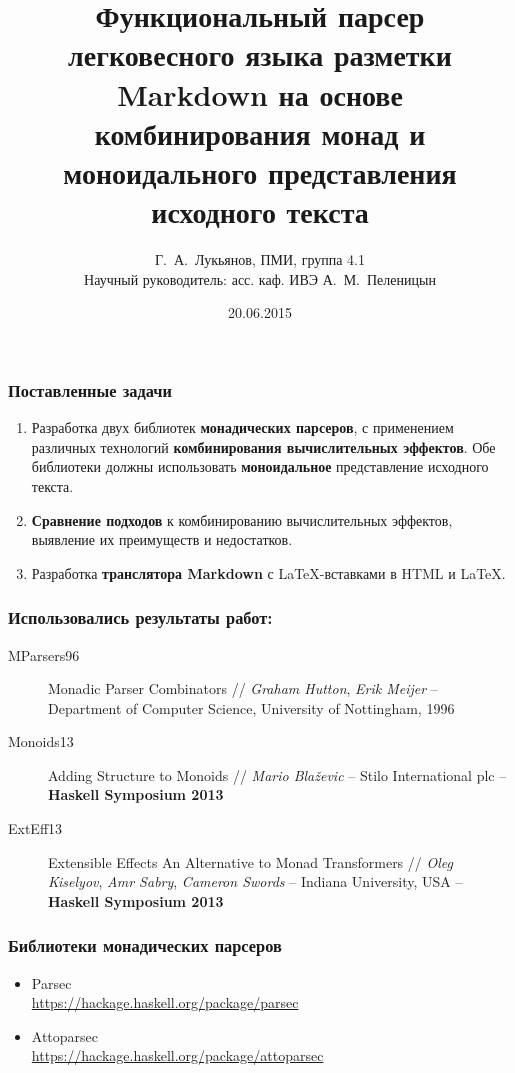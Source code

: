 \documentclass[12pt, compress, t]{beamer}
\title{Функциональный парсер легковесного языка разметки Markdown
на основе комбинирования монад и моноидального представления исходного текста}
\date{20.06.2015}
\author{Г.~А.~Лукьянов, ПМИ, группа 4.1 \\{Научный руководитель: асс. каф. ИВЭ А.~М.~Пеленицын}}
\institute{Институт математики, механики и компьютерных наук ЮФУ}
\begin{document}
\maketitle

\begin{frame}[fragile]
  \frametitle{Поставленные задачи}
  \begin{enumerate}
    \item Разработка двух библиотек \textbf{монадических парсеров}, 
    с применением различных технологий \textbf{комбинирования вычислительных 
    эффектов}. Обе библиотеки должны использовать \textbf{моноидальное}
    представление исходного текста.
    \item \textbf{Сравнение подходов} к комбинированию вычислительных эффектов, выявление их преимуществ и недостатков.
    \item Разработка \textbf{транслятора Markdown} с \LaTeX-вставками в HTML и \LaTeX.
  \end{enumerate}
\end{frame}

\begin{frame}[fragile]
  \frametitle{Использовались результаты работ: }
  \begin{description}
    \item [MParsers96]
    Monadic Parser Combinators // \textit{Graham Hutton}, \textit{Erik Meijer} –
Department of Computer Science, University of Nottingham, 1996
    \item [Monoids13]
    Adding Structure to Monoids // \textit{Mario Blaževic} – Stilo International plc – \\\textbf{Haskell Symposium 2013}
    \item [ExtEff13] 
    Extensible Effects An Alternative to Monad Transformers // \textit{Oleg
Kiselyov}, \textit{Amr Sabry}, \textit{Cameron Swords} – Indiana University, USA – \textbf{Haskell Symposium 2013}
  \end{description}
\end{frame}

\begin{frame}[fragile]
  \frametitle{Библиотеки монадических парсеров}
  \begin{itemize}
    \setlength\itemsep{2em}
    \item[] {\Large{Parsec}} \\
      \footnotesize{\url{https://hackage.haskell.org/package/parsec}}
    \item[] {\Large{Attoparsec}} \\
      \footnotesize{\url{https://hackage.haskell.org/package/attoparsec}}
  \end{itemize}
\end{frame}
\end{document}
